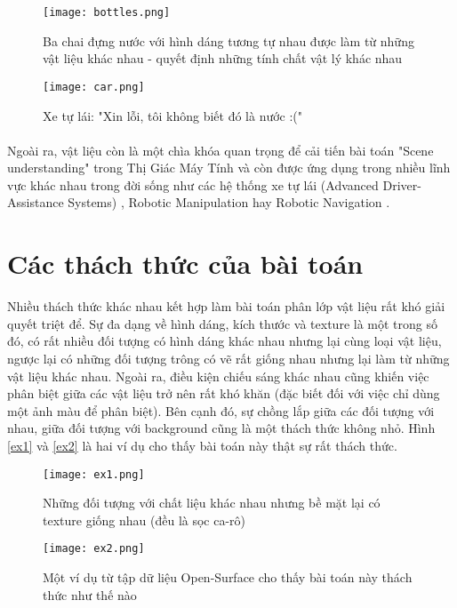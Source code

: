 \begin{figure}[h!]
	\centering
	\captionsetup{width=0.9\textwidth}
	\texttt{[image: bottles.png]}
	\caption{Ba chai đựng nước với hình dáng tương tự nhau được làm từ những vật liệu khác nhau - quyết định những tính chất vật lý khác nhau}
    \label{fig:bottles}
\end{figure}

\begin{figure}[h!]
	\centering
	\captionsetup{width=0.9\textwidth}
	\texttt{[image: car.png]}
	\caption{Xe tự lái: "Xin lỗi, tôi không biết đó là nước :("}
    \label{fig:car}
\end{figure}

\paragraph*{}
Ngoài ra, vật liệu còn là một chìa khóa quan trọng để cải tiến bài toán "Scene understanding" trong Thị Giác Máy Tính \cite{corbettreal} và còn được ứng dụng trong nhiều lĩnh vực khác nhau trong đời sống như các hệ thống xe tự lái (Advanced Driver-Assistance Systems) \cite{r1}, Robotic Manipulation \cite{spong2006robot} hay Robotic Navigation \cite{kim2013robot}. 

\section{Các thách thức của bài toán}
Nhiều thách thức khác nhau kết hợp làm bài toán phân lớp vật liệu rất khó giải quyết triệt để. Sự đa dạng về hình dáng, kích thước và texture là một trong số đó, có rất nhiều đối tượng có hình dáng khác nhau nhưng lại cùng loại vật liệu, ngược lại có những đối tượng trông có vẽ rất giống nhau nhưng lại làm từ những vật liệu khác nhau. Ngoài ra, điều kiện chiếu sáng khác nhau cũng khiến việc phân biệt giữa các vật liệu trở nên rất khó khăn (đặc biết đối với việc chỉ dùng một ảnh màu để phân biệt). Bên cạnh đó, sự chồng lắp giữa các đối tượng với nhau, giữa đối tượng với background cũng là một thách thức không nhỏ. Hình \ref{ex1} và \ref{ex2} là hai ví dụ cho thấy bài toán này thật sự rất thách thức.

\begin{figure}[h!]
	\centering
	\captionsetup{width=0.9\textwidth}
	\texttt{[image: ex1.png]}
	\caption{Những đối tượng với chất liệu khác nhau nhưng bề mặt lại có texture giống nhau (đều là sọc ca-rô)}
    \label{fig:ex1}
\end{figure}

\begin{figure}[h!]
	\centering
	\captionsetup{width=0.9\textwidth}
	\texttt{[image: ex2.png]}
	\caption{Một ví dụ từ tập dữ liệu Open-Surface cho thấy bài toán này thách thức như thế nào}
    \label{fig:ex2}
\end{figure}

